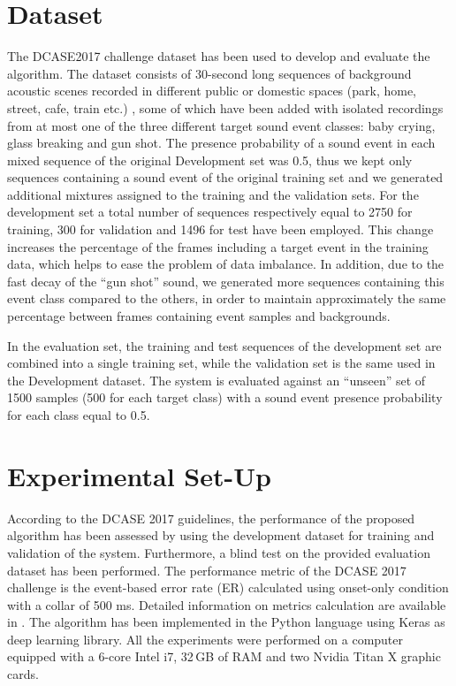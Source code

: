 \section{Dataset}
The DCASE2017 challenge dataset \cite{DCASE2017challenge} has been used to develop and evaluate the algorithm.  The dataset consists of 30-second long sequences of background acoustic scenes recorded in different public or domestic spaces (park, home, street, cafe, train etc.) \cite{mesaros2016tut}, some of which have been added with isolated recordings from at most one of the three different target sound event classes: baby crying, glass breaking and gun shot. 
The presence probability of a sound event in each mixed sequence of the original Development set was 0.5, thus we kept only sequences containing a sound event of the original training set and we generated additional mixtures assigned to the training and the validation sets.
For the development set a total number of sequences respectively equal to 2750 for training, 300 for validation and 1496 for test have been employed.
This change increases the percentage of the frames including a target event in the training data, which helps to ease the problem of data imbalance. In addition, due to the fast decay of the ``gun shot'' sound, we generated more sequences containing this event class compared to the others, in order to maintain approximately the same percentage between frames containing event samples and backgrounds.

In the evaluation set, the training and test sequences of the development set are combined into a single training set,  while the validation set is the same used in the Development dataset. The system is evaluated against an ``unseen'' set of 1500 samples (500 for each target class) with a sound event presence probability for each class equal to 0.5.


\section{Experimental Set-Up}
\label{sec:experiment}
According to the DCASE 2017 guidelines, the performance of the proposed algorithm has been assessed by using the development dataset for training and validation of the system. Furthermore, a blind test on the provided evaluation dataset has been performed.
The performance metric of the DCASE 2017 challenge is the event-based error rate (ER) calculated using onset-only condition with a collar of 500 ms. Detailed information on metrics calculation are available in \cite{Mesaros2016_MDPI}. The algorithm has been implemented in the Python language using Keras \cite{chollet2015keras} as deep learning library. All the experiments were performed on a computer equipped with a 6-core Intel i7, 32\,GB of RAM and two Nvidia Titan X graphic cards.


